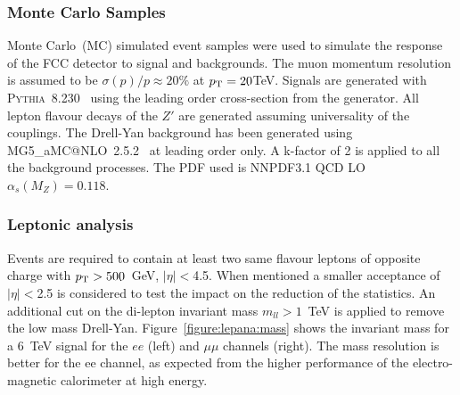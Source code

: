 \subsubsection{Monte Carlo Samples}
\label{subsection:MC}
Monte Carlo~(MC) simulated event samples were used to simulate the response of the FCC detector to signal and backgrounds. The muon momentum resolution 
is assumed to be $\sigma(p)/p \approx 20\%$ at $p_{\text{T}}= 20 $TeV. Signals are generated with {\scshape Pythia}~8.230~\cite{Sjostrand:2014zea} using the leading 
order cross-section from the generator. All lepton flavour decays of the $Z'$ are generated assuming universality of the couplings.
The Drell-Yan background has been generated using {\scshape MG5\_}a{\scshape MC@NLO}~2.5.2~\cite{Alwall:2014hca} at leading order only. 
A k-factor of 2 is applied to all the background processes. The PDF used is NNPDF3.1 QCD LO $\alpha_{s}(M_Z) = 0.118$.



\subsubsection{Leptonic analysis}
\label{subsection:lepana}

Events are required to contain at least two same flavour leptons of opposite charge with $p_{\text{T}} > 500$~GeV, $|\eta|<$4.5. 
When mentioned a smaller acceptance of $|\eta|<$2.5 is considered to test the impact on the reduction of the statistics. 
An additional cut on the di-lepton invariant mass $m_{ll}>1$~TeV is applied to remove the low mass Drell-Yan. 
Figure~\ref{figure:lepana:mass} shows the invariant mass for a 6~TeV signal for the $ee$ (left) and $\mu\mu$ channels (right). 
The mass resolution is better for the ee channel, as expected from the higher performance of the electro-magnetic calorimeter at high energy.

